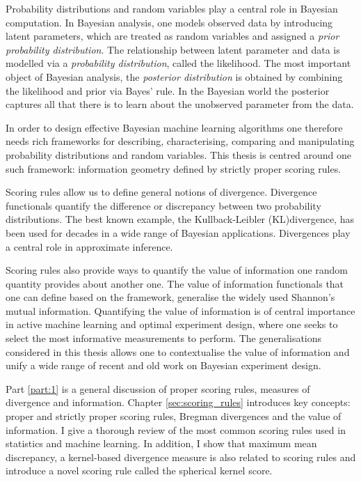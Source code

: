 
Probability distributions and random variables play a central role in Bayesian computation. In Bayesian analysis, one models observed data by introducing latent parameters, which are treated as random variables and assigned a \emph{prior probability distribution}. The relationship between latent parameter and data is modelled via a \emph{probability distribution}, called the likelihood. The most important object of Bayesian analysis, the  \emph{posterior distribution} is obtained by combining the likelihood and prior via Bayes' rule. In the Bayesian world the posterior captures all that there is to learn about the unobserved parameter from the data.

In order to design effective Bayesian machine learning algorithms one therefore needs rich frameworks for describing, characterising, comparing and manipulating probability distributions and random variables. This thesis is centred around one such framework: information geometry defined by strictly proper scoring rules.

Scoring rules allow us to define general notions of divergence. Divergence functionals quantify the difference or discrepancy between two probability distributions. The best known example, the Kullback-Leibler (KL)divergence, has been used for decades in a wide range of Bayesian applications. Divergences play a central role in approximate inference.

Scoring rules also provide ways to quantify the value of information one random quantity provides about another one. The value of information functionals that one can define based on the framework, generalise the widely used Shannon's mutual information. Quantifying the value of information is of central importance in active machine learning and optimal experiment design, where one seeks to select the most informative measurements to perform. The generalisations considered in this thesis allows one to contextualise the value of information and unify a wide range of recent and old work on Bayesian experiment design.

Part \ref{part:1} is a general discussion of proper scoring rules, measures of divergence and information. Chapter \ref{sec:scoring_rules} introduces key concepts: proper and strictly proper scoring rules, Bregman divergences and the value of information. I give a thorough review of the most common scoring rules used in statistics and machine learning. In addition, I show that maximum mean discrepancy, a kernel-based divergence measure is also related to scoring rules and introduce a novel scoring rule called the spherical kernel score.

